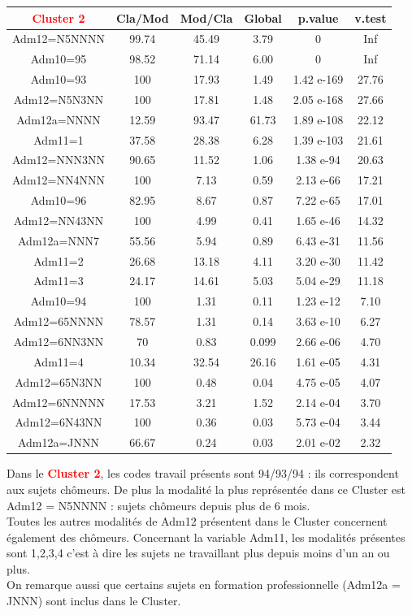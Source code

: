 \documentclass{book}
\begin{document}
\bigskip
\setlength\arrayrulewidth{2pt}
\begin{tabular}{|c||ccccc|}
\hline
 \textbf{\textcolor{red}{Cluster 2}}            &    Cla/Mod  &   Mod/Cla   &   Global   &    p.value  &   v.test  \\
\hline
\hline 
   
Adm12=N5NNNN  &99.74 &45.49 & 3.79 & 0   		&     Inf\\
Adm10=95      &98.52 &71.14 & 6.00 & 0  		&      Inf\\
Adm10=93      &100   &17.93 & 1.49 &1.42 e-169 	&27.76\\
Adm12=N5N3NN  &100   &17.81 & 1.48 &2.05 e-168  &27.66\\
Adm12a=NNNN   &12.59 &93.47 &61.73 &1.89 e-108  &22.12\\
Adm11=1       &37.58 &28.38 & 6.28 &1.39 e-103  &21.61\\
Adm12=NNN3NN  &90.65 &11.52 & 1.06 & 1.38 e-94  &20.63\\
Adm12=NN4NNN  & 100  &7.13 & 0.59 & 2.13 e-66  &17.21\\
Adm10=96      & 82.95 & 8.67 & 0.87 & 7.22 e-65  &17.01\\
Adm12=NN43NN& 100 & 4.99 & 0.41 & 1.65 e-46  &14.32\\
Adm12a=NNN7   &55.56 & 5.94 & 0.89 & 6.43 e-31  &11.56\\
Adm11=2       &26.68 &13.18 & 4.11 & 3.20 e-30  &11.42\\
Adm11=3       &24.17 &14.61 & 5.03  &5.04 e-29  &11.18\\
Adm10=94      &100 & 1.31 & 0.11  &1.23 e-12  & 7.10\\
Adm12=65NNNN  &78.57 & 1.31 & 0.14  &3.63 e-10  & 6.27\\
Adm12=6NN3NN  &70 & 0.83& 0.099  &2.66 e-06  & 4.70\\
Adm11=4       &10.34 & 32.54 &26.16  &1.61 e-05  & 4.31\\
Adm12=65N3NN  &100 & 0.48 & 0.04  &4.75 e-05  & 4.07\\
Adm12=6NNNNN & 17.53 & 3.21 & 1.52  &2.14 e-04  & 3.70\\
Adm12=6N43NN &100 & 0.36 & 0.03  &5.73 e-04  & 3.44\\
Adm12a=JNNN  & 66.67 & 0.24  &0.03  &2.01 e-02  & 2.32\\
\hline
\end{tabular}

\bigskip
\noindent
Dans le \textbf{\textcolor{red}{Cluster 2}}, les codes travail présents sont 94/93/94 : ils correspondent aux sujets chômeurs. De plus la modalité la plus représentée dans ce Cluster est Adm12 = N5NNNN : sujets chômeurs depuis plus de 6 mois.\\
Toutes les autres modalités de Adm12 présentent dans le Cluster concernent également des chômeurs.
Concernant la variable Adm11, les modalités présentes sont 1,2,3,4 c'est à dire les sujets ne travaillant plus depuis moins d'un an ou plus.\\
On remarque aussi que certains sujets en formation professionnelle (Adm12a = JNNN) sont inclus dans le Cluster.\\
\end{document}
